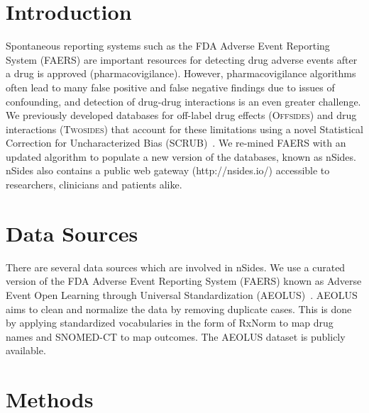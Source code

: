 \documentclass{ws-procs11x85}
\begin{document}
\bodymatter

\section{Introduction}

Spontaneous reporting systems such as the FDA Adverse Event Reporting
System (FAERS) are important resources for detecting drug adverse
events after a drug is approved (pharmacovigilance). However,
pharmacovigilance algorithms often lead to many false positive and
false negative findings due to issues of confounding, and detection of
drug-drug interactions is an even greater challenge.  We previously
developed databases for off-label drug effects (O\textsc{ffsides}) and
drug interactions (T\textsc{wosides}) that account for these
limitations using a novel Statistical Correction for Uncharacterized
Bias (SCRUB)~\cite{Tatonetti2012}.  We re-mined FAERS with an updated
algorithm to populate a new version of the databases, known as nSides.
nSides also contains a public web gateway (http://nsides.io/)
accessible to researchers, clinicians and patients alike.


\section{Data Sources}

There are several data sources which are involved in nSides. We use a
curated version of the FDA Adverse Event Reporting System (FAERS)
known as Adverse Event Open Learning through Universal Standardization
(AEOLUS)~\cite{AEOLUS}.  AEOLUS aims to clean and normalize the data
by removing duplicate cases. This is done by applying standardized
vocabularies in the form of RxNorm to map drug names and SNOMED-CT to
map outcomes. The AEOLUS dataset is publicly available.

\section{Methods}
\end{document}
